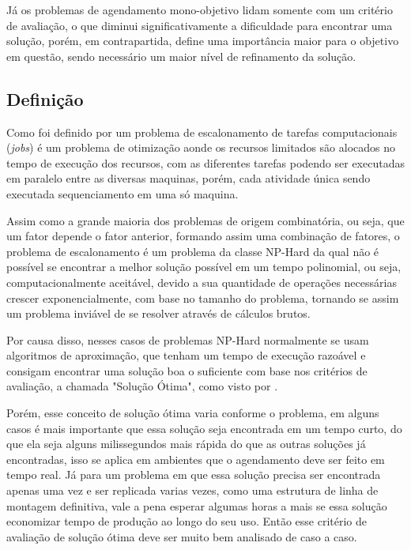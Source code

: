         Já os problemas de agendamento mono-objetivo lidam somente com um critério de avaliação, o que diminui significativamente a dificuldade para encontrar uma solução, porém, em contrapartida, define uma importância maior para o objetivo em questão, sendo necessário um maior nível de refinamento da solução.

    \subsection{Definição}
        Como foi definido por \cite{Bagchi1999} um problema de escalonamento de tarefas computacionais (\textit{jobs}) é um problema de otimização aonde os recursos limitados são alocados no tempo de execução dos recursos, com as diferentes tarefas podendo ser executadas em paralelo entre as diversas maquinas, porém, cada atividade única sendo executada sequenciamento em uma só maquina.\hfill\vspace{\onelineskip}

        Assim como a grande maioria dos problemas de origem combinatória, ou seja, que um fator depende o fator anterior, formando assim uma combinação de fatores, o problema de escalonamento é um problema da classe NP-Hard da qual não é possível se encontrar a melhor solução possível em um tempo polinomial, ou seja, computacionalmente aceitável, devido a sua quantidade de operações necessárias crescer exponencialmente, com base no tamanho do problema, tornando se assim um problema inviável de se resolver através de cálculos brutos.\hfill\vspace{\onelineskip}

        Por causa disso, nesses casos de problemas NP-Hard normalmente se usam algoritmos de aproximação, que tenham um tempo de execução razoável e consigam encontrar uma solução boa o suficiente com base nos critérios de avaliação, a chamada "Solução Ótima", como visto por \cite{lawler1993}.\hfill\vspace{\onelineskip}

        Porém, esse conceito de solução ótima varia conforme o problema, em alguns casos é mais importante que essa solução seja encontrada em um tempo curto, do que ela seja alguns milissegundos mais rápida do que as outras soluções já encontradas, isso se aplica em ambientes que o agendamento deve ser feito em tempo real.\hfill
        Já para um problema em que essa solução precisa ser encontrada apenas uma vez e ser replicada varias vezes, como uma estrutura de linha de montagem definitiva, vale a pena esperar algumas horas a mais se essa solução economizar tempo de produção ao longo do seu uso. Então esse critério de avaliação de solução ótima deve ser muito bem analisado de caso a caso.\hfill\vspace{\onelineskip}

